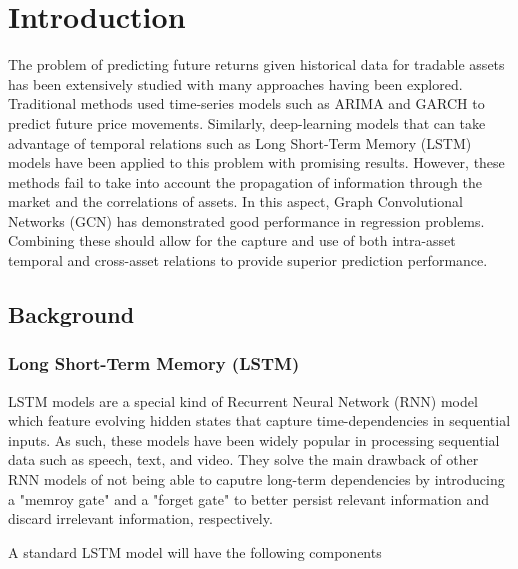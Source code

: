 \section{Introduction} \label{Introduction}

The problem of predicting future returns given historical data for tradable assets has been extensively studied 
with many approaches having been explored. Traditional methods used time-series models such as ARIMA and GARCH to predict future price movements. Similarly, deep-learning models that can take advantage of temporal relations such as Long Short-Term Memory (LSTM) models have been applied to this problem with promising results. 
However, these methods fail to take into account the propagation of information through the market and the correlations of assets. In this aspect, Graph Convolutional Networks (GCN) has demonstrated good performance in regression problems. Combining these should allow for the capture and use of both intra-asset temporal and cross-asset relations to provide superior prediction performance.

\subsection{Background} \label{Background}

\subsubsection{Long Short-Term Memory (LSTM)} \label{LSTM}


LSTM models are a special kind of Recurrent Neural Network (RNN) model which feature evolving hidden states that capture time-dependencies in sequential inputs. As such, these models have been widely popular in processing sequential data such as speech, text, and video. They solve the main drawback of other RNN models of not being able to caputre long-term dependencies by introducing a "memroy gate" and a "forget gate" to better persist relevant information and discard irrelevant information, respectively. 

A standard LSTM model will have the following components

